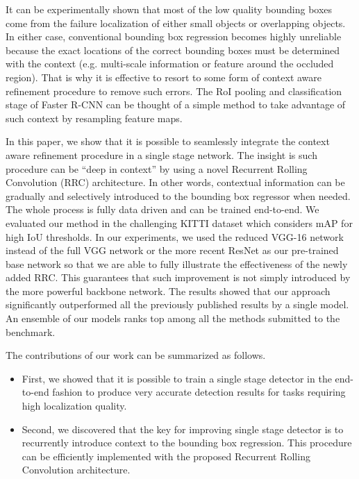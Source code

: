 \documentclass[10pt,twocolumn,letterpaper]{article}
\begin{document}
It can be experimentally shown that most of the low quality bounding boxes come from the failure localization of either small objects or overlapping objects. In either case, conventional bounding box regression becomes highly unreliable because the exact locations of the correct bounding boxes must be determined with the context (e.g. multi-scale information or feature around the occluded region). That is why it is effective to resort to some form of context aware refinement procedure to remove such errors. The RoI pooling and classification stage of Faster R-CNN can be thought of a simple method to take advantage of such context by resampling feature maps.

In this paper, we show that it is possible to seamlessly integrate the context aware refinement procedure in a single stage network. The insight is such procedure can be ``deep in context'' by using a novel Recurrent Rolling Convolution (RRC) architecture. In other words, contextual information can be gradually and selectively introduced to the bounding box regressor when needed. The whole process is fully data driven and can be trained end-to-end. We evaluated our method in the challenging KITTI dataset which considers mAP for high IoU thresholds. In our experiments, we used the reduced VGG-16 network instead of the full VGG network or the more recent ResNet as our pre-trained base network so that we are able to fully illustrate the effectiveness of the newly added RRC. This guarantees that such improvement is not simply introduced by the more powerful backbone network. The results showed that our approach significantly outperformed all the previously published results by a single model. An ensemble of our models ranks top among all the methods submitted to the benchmark.

The contributions of our work can be summarized as follows.
\vspace{-0.5\baselineskip}
\begin{itemize}
   \item First, we showed that it is possible to train a single stage detector in the end-to-end fashion to produce very accurate detection results for tasks requiring high localization quality.
   \vspace{-0.5\baselineskip}
   \item Second, we discovered that the key for improving single stage detector is to recurrently introduce context to the bounding box regression. This procedure can be efficiently implemented with the proposed Recurrent Rolling Convolution architecture.
\end{itemize}
\end{document}
